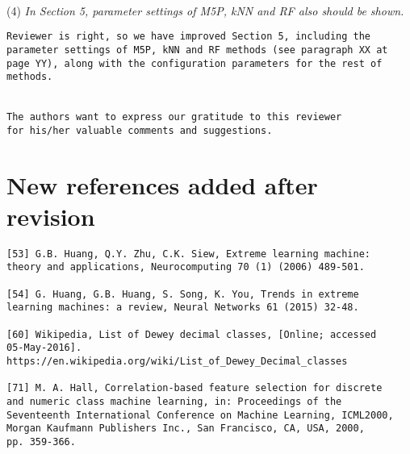 \documentclass[preprint]{elsarticle}
\begin{document}
~\\
\noindent (4) \emph{In Section 5, parameter settings of 
M5P, kNN and RF also should be shown. } 

\begin{verbatim}
Reviewer is right, so we have improved Section 5, including the 
parameter settings of M5P, kNN and RF methods (see paragraph XX at 
page YY), along with the configuration parameters for the rest of 
methods.


The authors want to express our gratitude to this reviewer 
for his/her valuable comments and suggestions.
\end{verbatim}



\section{New references added after revision}

\begin{verbatim}
[53] G.B. Huang, Q.Y. Zhu, C.K. Siew, Extreme learning machine: 
theory and applications, Neurocomputing 70 (1) (2006) 489-501.

[54] G. Huang, G.B. Huang, S. Song, K. You, Trends in extreme 
learning machines: a review, Neural Networks 61 (2015) 32-48.

[60] Wikipedia, List of Dewey decimal classes, [Online; accessed 
05-May-2016]. https://en.wikipedia.org/wiki/List_of_Dewey_Decimal_classes

[71] M. A. Hall, Correlation-based feature selection for discrete 
and numeric class machine learning, in: Proceedings of the 
Seventeenth International Conference on Machine Learning, ICML2000, 
Morgan Kaufmann Publishers Inc., San Francisco, CA, USA, 2000, 
pp. 359-366.
\end{verbatim}
\end{document}
